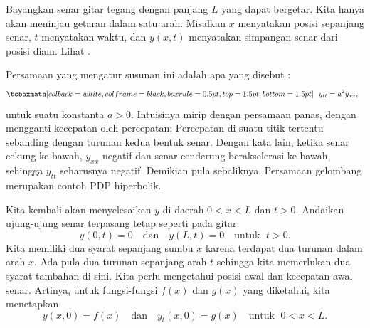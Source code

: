 Bayangkan senar gitar tegang dengan panjang $L$ yang dapat bergetar.
Kita hanya akan meninjau getaran dalam satu arah.  Misalkan
$x$ menyatakan posisi sepanjang senar, $t$ menyatakan waktu,
dan $y(x,t)$
menyatakan simpangan senar dari posisi diam.
Lihat
.

\begin{myfig}
\capstart
{}
\caption{Senar bergetar dengan panjang $L$, $x$ adalah posisi, $y$ adalah simpangan.\label{we:vibstrfig}}
\end{myfig}

Persamaan yang mengatur susunan ini adalah apa yang disebut
\emph{}:
\begin{equation*}
\mybxbg{~~
y_{tt} =
a^2 y_{xx} ,
~~}
\end{equation*}
untuk suatu konstanta $a > 0$.
Intuisinya mirip dengan persamaan panas, dengan mengganti kecepatan oleh
percepatan: Percepatan di suatu titik tertentu sebanding dengan turunan kedua
bentuk senar.  Dengan kata lain,
ketika senar
cekung ke bawah, $y_{xx}$ negatif dan senar cenderung berakselerasi
ke bawah, sehingga $y_{tt}$ seharusnya negatif.  Demikian pula sebaliknya.
Persamaan gelombang merupakan contoh PDP hiperbolik\@.

Kita kembali akan menyelesaikan $y$ di daerah $0 < x < L$ dan $t > 0$.
Andaikan ujung-ujung senar terpasang tetap seperti pada gitar:
\begin{equation*}
y(0,t) = 0 \quad \text{dan} \quad y(L,t) = 0 \quad \text{untuk } \; t > 0.
\end{equation*}
Kita memiliki dua syarat sepanjang sumbu $x$ karena terdapat
dua turunan dalam arah $x$.
Ada pula dua turunan sepanjang arah $t$ sehingga kita memerlukan
dua syarat tambahan di sini.  Kita perlu mengetahui posisi awal
dan kecepatan awal senar.  Artinya,
untuk fungsi-fungsi $f(x)$ dan $g(x)$ yang diketahui, kita menetapkan
\begin{equation*}
y(x,0) = f(x)  \quad \text{dan} \quad y_t (x,0) = g(x)
\quad \text{untuk } \; 0 < x < L .
\end{equation*}

